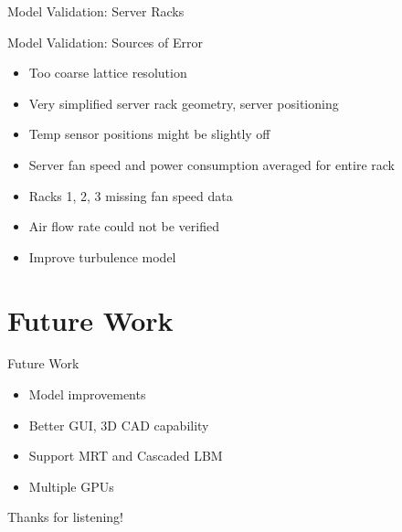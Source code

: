 \documentclass{beamer}
\begin{document}
\begin{frame}{Model Validation: Server Racks}
\begin{table}[h]
\caption{The RMS of the difference between simulated and experimental temperatures in \degree C at different positions on the server racks.}
\begin{center}
\end{center}
\label{tab:rms_rack_temps}
\end{table}
\end{frame}

\begin{frame}{Model Validation: Sources of Error}

\begin{itemize}
\item Too coarse lattice resolution
\item Very simplified server rack geometry, server positioning
\item Temp sensor positions might be slightly off
\item Server fan speed and power consumption averaged for entire rack
\item Racks 1, 2, 3 missing fan speed data
\item Air flow rate could not be verified
\item Improve turbulence model
\end{itemize}

\end{frame}

\section{Future Work}
\begin{frame}{Future Work}
\begin{itemize}
\item Model improvements
\item Better GUI, 3D CAD capability
\item Support MRT and Cascaded LBM
\item Multiple GPUs
\end{itemize}
\end{frame}


\begin{frame}{Thanks for listening!}

\end{frame}
\end{document}
